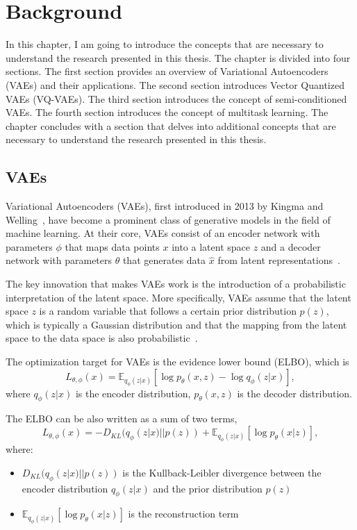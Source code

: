 \chapter{Background}

In this chapter, I am going to introduce the concepts that are necessary to understand the research presented in this thesis. The chapter is divided into four sections. The first section provides an overview of Variational Autoencoders (VAEs) and their applications. The second section introduces Vector Quantized VAEs (VQ-VAEs). The third section introduces the concept of semi-conditioned VAEs. The fourth section introduces the concept of multitask learning. The chapter concludes with a section that delves into additional concepts that are necessary to understand the research presented in this thesis.

\section{VAEs}

Variational Autoencoders (VAEs), first introduced in 2013 by Kingma and Welling~\cite{kingma2013autoencoding}, have become a prominent class of generative models in the field of machine learning.  At their core, VAEs consist of an encoder network with parameters $\phi$ that maps data points $x$ into a latent space $z$ and a decoder network with parameters $\theta$ that generates data $\hat{x}$ from latent representations~\cite{Kingma_2019}. 

The key innovation that makes VAEs work is the introduction of a probabilistic interpretation of the latent space. More specifically, VAEs assume that the latent space $z$ is a random variable that follows a certain prior distribution $p(z)$, which is typically a Gaussian distribution and that the mapping from the latent space to the data space is also probabilistic~\cite{kingma2013autoencoding}.

The optimization target for VAEs is the evidence lower bound (ELBO), which is
 \[ L_{\theta, \phi}(x) = \mathbb{E}_{q_{\phi}(z|x)} [\log p_{\theta}(x, z) - \log q_{\phi}(z|x)], \]
where $q_{\phi}(z|x)$ is the encoder distribution, $p_{\theta}(x, z)$ is the decoder distribution. 

The ELBO can be also written as a sum of two terms,
 \[ L_{\theta, \phi}(x) = - D_{KL}(q_{\phi}(z|x) || p(z)) + \mathbb{E}_{q_{\phi}(z|x)} [\log p_{\theta}(x|z)], \]
 where:

\begin{itemize}
    \item $D_{KL}(q_{\phi}(z|x) || p(z))$ is the Kullback-Leibler divergence between the encoder distribution $q_{\phi}(z|x)$ and the prior distribution $p(z)$
    \item $\mathbb{E}_{q_{\phi}(z|x)} [\log p_{\theta}(x|z)]$ is the reconstruction term
\end{itemize}

